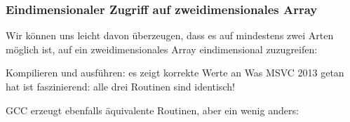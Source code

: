\subsubsection{Eindimensionaler Zugriff auf zweidimensionales Array}
Wir können uns leicht davon überzeugen, dass es auf mindestens zwei Arten möglich ist, auf ein zweidimensionales Array
eindimensional zuzugreifen:



Kompilieren und ausführen: es zeigt korrekte Werte an
Was MSVC 2013 getan hat ist faszinierend: alle drei Routinen sind identisch!



GCC erzeugt ebenfalls äquivalente Routinen, aber ein wenig anders:



